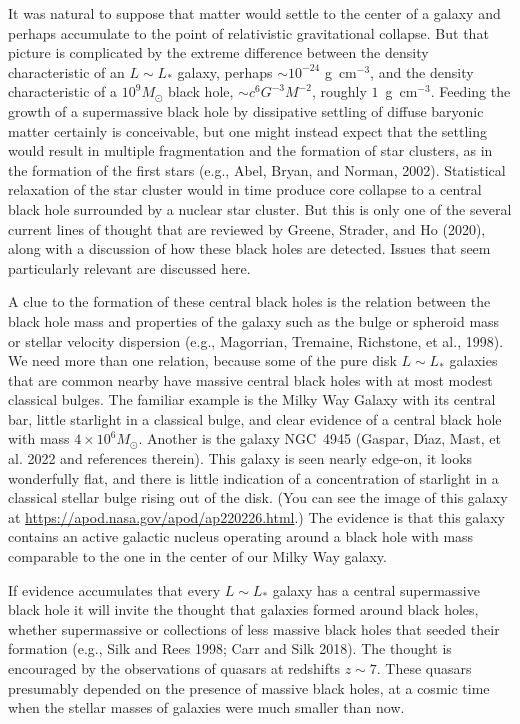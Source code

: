 \documentclass[fleqn,usenatbib]{mnras}
\begin{document}
It was natural to suppose that matter would settle to the center of a galaxy and perhaps accumulate to the point of relativistic gravitational collapse. But that picture is complicated by the extreme difference between the density characteristic of an $L\sim L_\ast$ galaxy, perhaps $\sim 10^{-24}$ g~cm$^{-3}$, and the density characteristic of a $10^{9} M_\odot$ black hole, $\sim c^6G^{-3}M^{-2}$, roughly $1$~g~cm$^{-3}$. Feeding the growth of a supermassive black hole by dissipative settling of diffuse baryonic matter certainly is conceivable, but one might instead expect that the settling would result in multiple fragmentation and the formation of star clusters, as in the formation of the first stars (e.g., Abel, Bryan, and Norman, 2002). Statistical relaxation of the star cluster would in time produce core collapse to a central black hole surrounded by a nuclear star cluster. But this is only one of the several current lines of thought that are reviewed by Greene, Strader, and Ho (2020), along with a discussion of how these black holes are detected. Issues that seem particularly relevant are discussed here.

A clue to the formation of these central black holes is the relation between the  black hole mass and properties of the galaxy such as the bulge or spheroid mass or stellar velocity dispersion (e.g., Magorrian, Tremaine, Richstone, et al., 1998). We need more than one relation, because some of the pure disk $L\sim L_\ast$ galaxies that are common nearby have massive central black holes with at most modest classical bulges. The familiar example is the Milky Way Galaxy with its central bar, little starlight in a classical bulge, and clear evidence of a central black hole with mass $4\times 10^6 M_\odot$. Another is the galaxy NGC~4945 (Gaspar, D{\'\i}az, Mast, et al. 2022 and references therein). This galaxy is seen nearly edge-on, it looks wonderfully flat, and there is little indication of a concentration of starlight in a classical stellar bulge rising out of the disk. (You can see the image of this galaxy at \url{https://apod.nasa.gov/apod/ap220226.html}.) The evidence is that this galaxy contains an active galactic nucleus operating around a black hole with mass comparable to the one in the center of our Milky Way galaxy.

If evidence accumulates that every $L\sim L_\ast$ galaxy has a central supermassive black hole it will invite the thought that galaxies formed around black holes, whether supermassive or collections of less massive black holes that seeded their formation (e.g., Silk and Rees 1998; Carr and Silk 2018). The thought is encouraged by the observations of quasars at redshifts $z\sim 7$. These quasars presumably depended on the presence of massive black holes, at a cosmic time when the stellar masses of galaxies were much smaller than now. 
\end{document}
